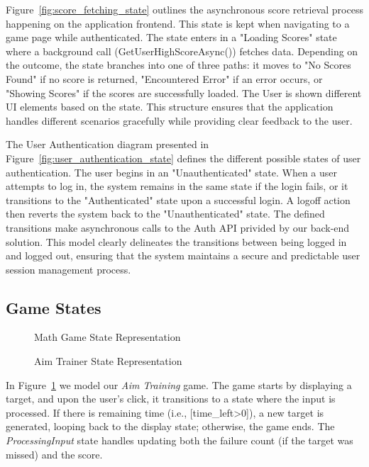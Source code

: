 \documentclass[11pt,a4paper]{article}
\newcommand{\inputdiagram}[1]{}
\newcommand{\textwidthdiagram}[2][1]{%
  \resizebox{#1\textwidth}{!}{\inputdiagram{#2}}%
}
\begin{document}
Figure~\ref{fig:score_fetching_state} outlines the asynchronous score
retrieval process happening on the application frontend. This state is kept
when navigating to a game page while authenticated. The state enters in a
"Loading Scores" state where a background call (GetUserHighScoreAsync())
fetches data. Depending on the outcome, the state branches into one
of three paths: it moves to "No Scores Found" if no score is returned,
"Encountered Error" if an error occurs, or "Showing Scores" if the scores
are successfully loaded. The User is shown different UI elements based on
the state. This structure ensures that the application handles different
scenarios gracefully while providing clear feedback to the user.

The User Authentication diagram presented in
Figure~\ref{fig:user_authentication_state} defines the different possible
states of user authentication. The user begins in an "Unauthenticated" state. When a
user attempts to log in, the system remains in the same state if the login
fails, or it transitions to the "Authenticated" state upon a successful
login. A logoff action then reverts the system back to the "Unauthenticated"
state. The defined transitions make asynchronous calls to the Auth API privided
by our back-end solution. This model clearly delineates the transitions
between being logged in and logged out, ensuring that the system maintains
a secure and predictable user session management process.

\subsection{Game States}
\begin{figure}[H]
    \centering
    \begin{minipage}[b]{0.48\textwidth}
        \centering
        \textwidthdiagram{math_state.tex}
        \caption{Math Game State Representation}
        \label{fig:math_state}
    \end{minipage}
    \hfil
    \begin{minipage}[b]{0.48\textwidth}
        \centering
        \textwidthdiagram{aim_trainer_state.tex}
        \caption{Aim Trainer State Representation}
        \label{fig:aim_trainer_state}
    \end{minipage}
\end{figure}

In Figure~\ref{fig:aim_trainer_state} we model our \textit{Aim Training} game. The
game starts by displaying a target, and upon the user's click, it transitions
to a state where the input is processed. If there is remaining time (i.e.,
[time\_left>0]), a new target is generated, looping back to the display state;
otherwise, the game ends. The \textit{ProcessingInput} state handles updating both
the failure count (if the target was missed) and the score.
\end{document}
